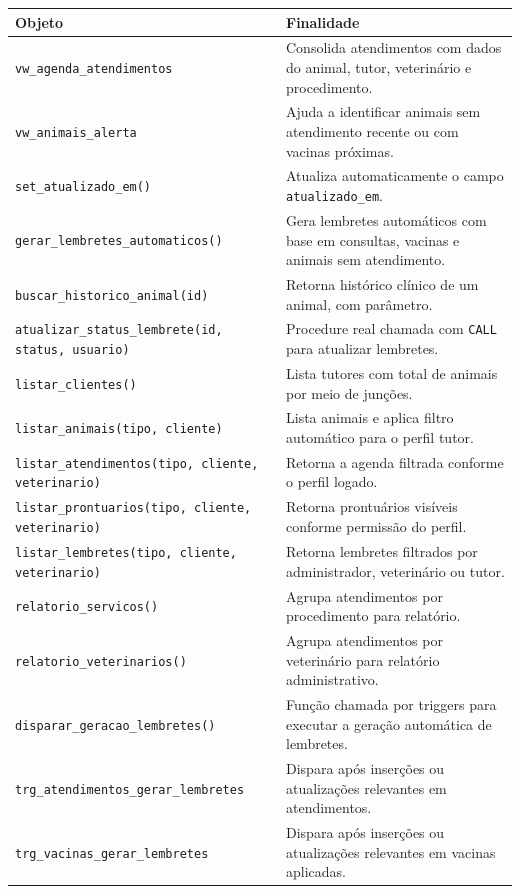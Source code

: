 \documentclass[12pt,a4paper]{article}
\begin{document}
\begin{longtable}{p{5cm}p{9cm}}
\toprule
\textbf{Objeto} & \textbf{Finalidade} \\
\midrule
\texttt{vw\_agenda\_atendimentos} & Consolida atendimentos com dados do animal, tutor, veterinário e procedimento. \\
\texttt{vw\_animais\_alerta} & Ajuda a identificar animais sem atendimento recente ou com vacinas próximas. \\
\texttt{set\_atualizado\_em()} & Atualiza automaticamente o campo \texttt{atualizado\_em}. \\
\texttt{gerar\_lembretes\_automaticos()} & Gera lembretes automáticos com base em consultas, vacinas e animais sem atendimento. \\
\texttt{buscar\_historico\_animal(id)} & Retorna histórico clínico de um animal, com parâmetro. \\
\texttt{atualizar\_status\_lembrete(id, status, usuario)} & Procedure real chamada com \texttt{CALL} para atualizar lembretes. \\
\texttt{listar\_clientes()} & Lista tutores com total de animais por meio de junções. \\
\texttt{listar\_animais(tipo, cliente)} & Lista animais e aplica filtro automático para o perfil tutor. \\
\texttt{listar\_atendimentos(tipo, cliente, veterinario)} & Retorna a agenda filtrada conforme o perfil logado. \\
\texttt{listar\_prontuarios(tipo, cliente, veterinario)} & Retorna prontuários visíveis conforme permissão do perfil. \\
\texttt{listar\_lembretes(tipo, cliente, veterinario)} & Retorna lembretes filtrados por administrador, veterinário ou tutor. \\
\texttt{relatorio\_servicos()} & Agrupa atendimentos por procedimento para relatório. \\
\texttt{relatorio\_veterinarios()} & Agrupa atendimentos por veterinário para relatório administrativo. \\
\texttt{disparar\_geracao\_lembretes()} & Função chamada por triggers para executar a geração automática de lembretes. \\
\texttt{trg\_atendimentos\_gerar\_lembretes} & Dispara após inserções ou atualizações relevantes em atendimentos. \\
\texttt{trg\_vacinas\_gerar\_lembretes} & Dispara após inserções ou atualizações relevantes em vacinas aplicadas. \\
\bottomrule
\end{longtable}
\end{document}
